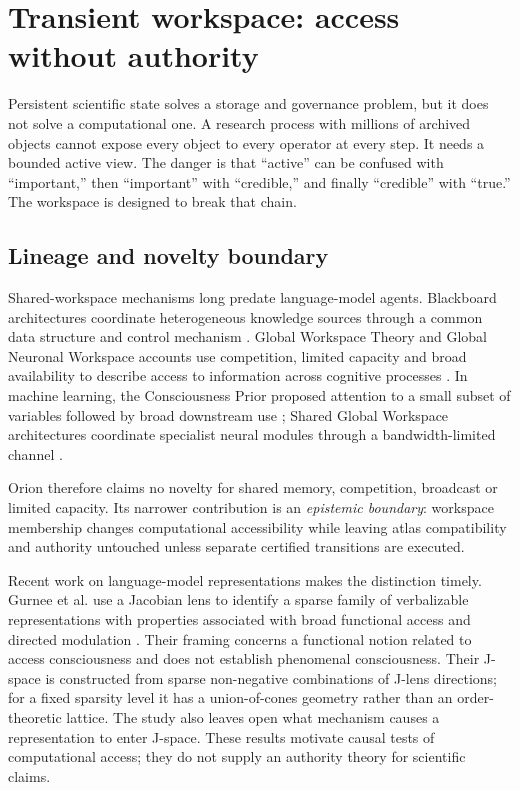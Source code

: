 \section{Transient workspace: access without authority}\label{sec:workspace}

Persistent scientific state solves a storage and governance problem, but it does not solve a computational one. A research process with millions of archived objects cannot expose every object to every operator at every step. It needs a bounded active view. The danger is that ``active'' can be confused with ``important,'' then ``important'' with ``credible,'' and finally ``credible'' with ``true.'' The workspace is designed to break that chain.

\subsection{Lineage and novelty boundary}

Shared-workspace mechanisms long predate language-model agents. Blackboard architectures coordinate heterogeneous knowledge sources through a common data structure and control mechanism \cite{hayesroth1985,nii1986}. Global Workspace Theory and Global Neuronal Workspace accounts use competition, limited capacity and broad availability to describe access to information across cognitive processes \cite{baars1988,dehaene2001,mashour2020}. In machine learning, the Consciousness Prior proposed attention to a small subset of variables followed by broad downstream use \cite{bengio2017}; Shared Global Workspace architectures coordinate specialist neural modules through a bandwidth-limited channel \cite{goyal2021}.

Orion therefore claims no novelty for shared memory, competition, broadcast or limited capacity. Its narrower contribution is an \emph{epistemic boundary}: workspace membership changes computational accessibility while leaving atlas compatibility and authority untouched unless separate certified transitions are executed.

Recent work on language-model representations makes the distinction timely. Gurnee et al. use a Jacobian lens to identify a sparse family of verbalizable representations with properties associated with broad functional access and directed modulation \cite{gurnee2026}. Their framing concerns a functional notion related to access consciousness and does not establish phenomenal consciousness. Their J-space is constructed from sparse non-negative combinations of J-lens directions; for a fixed sparsity level it has a union-of-cones geometry rather than an order-theoretic lattice. The study also leaves open what mechanism causes a representation to enter J-space. These results motivate causal tests of computational access; they do not supply an authority theory for scientific claims.

